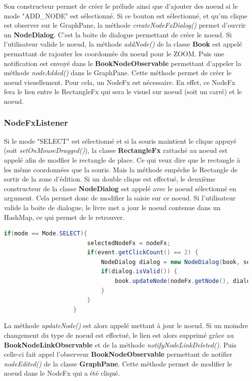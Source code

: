 			Son constructeur permet de créer le prélude ainsi que d'ajouter des noeud si le mode "ADD\_NODE" est sélectionné. Si ce bouton est sélectionné, et qu'un clique est observer sur le GraphPane, la méthode \textit{createNodeFxDialog()} permet d'ouvrir un \textbf{NodeDialog}. C'est la boite de dialogue permettant de créer le noeud. Si l'utilisateur valide le noeud, la méthode \textit{addNode()} de la classe \textbf{Book} est appelé permattant de rajouter les coordonnée du noeud pour le ZOOM. Puis une notification est envoyé dans le \textbf{BookNodeObservable} permettant d'appeler la méthode \textit{nodeAdded()} dans le GraphPane. Cette méthode permet de créer le noeud visuellement. Pour cela, un NodeFx est nécessaire. En effet, ce NodeFx fera le lien entre le RectangleFx qui sera le visuel sur noeud (soit un carré) et le noeud.

			\subsubsection{NodeFxListener}
				Si le mode "SELECT" est sélectionné et si la souris maintient le clique appuyé (soit \textit{setOnMouseDragged()}), la classe \textbf{RectangleFx} rattaché au noeud est appelé afin de modfier le rectangle de place. Ce qui veux dire que le rectangle à les même coordonnées que la souris. Mais la méthode empêche le Rectangle de sortir de la zone d'édition.
				Si un double clique est effectué, le deuxième constructeur de la classe \textbf{NodeDialog} est appelé avec le noeud sélectionné en argument. Cela permet donc de modifier la saisie sur ce noeud. Si l'utilisateur valide la boite de dialogue, le livre met a jour le noeud contenue dans un HashMap, ce qui permet de le retrouver.

				\begin{lstlisting}[gobble=20, language=java, caption=Classe NodeFxListener avec le mode SELECT]
					if(mode == Mode.SELECT){
						selectedNodeFx = nodeFx;
						if(event.getClickCount() == 2) {
							NodeDialog dialog = new NodeDialog(book, selectedNodeFx.getNode());
							if(dialog.isValid()) {
								book.updateNode(nodeFx.getNode(), dialog.getNode());
							}
						}
					}
				\end{lstlisting}

				La méthode \textit{updateNode()} est alors appelé mettant à jour le noeud. Si un moindre changement du type de noeud est effectué, le lien est alors supprimé grâce au \textbf{BookNodeLinkObservable} et de la méthode \textit{notifyNodeLinkDeleted()}.
				Puis celle-ci fait appel l'observeur \textbf{BookNodeObservable} permettant de notifier \textit{nodeEdited()} de la classe \textbf{GraphPane}. Cette méthode permet de modifier le noeud dans le NodeFx qui a été cliqué.


